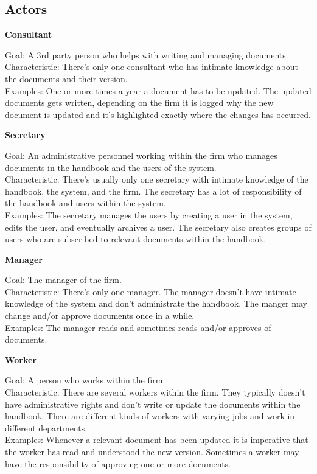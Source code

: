 \subsection{Actors}

\textbf{Consultant}

Goal: A 3rd party person who helps with writing and managing documents.
\\
Characteristic: There’s only one consultant who has intimate knowledge about the documents and their version.
\\
Examples: One or more times a year a document has to be updated. The updated documents gets written, depending on the firm it is logged why the new document is updated and it’s highlighted exactly where the changes has occurred.

\textbf{Secretary}

Goal: An administrative personnel working within the firm who manages documents in the handbook and the users of the system.
\\
Characteristic: There’s usually only one secretary with intimate knowledge of the handbook, the system, and the firm. The secretary has a lot of responsibility of the handbook and users within the system.
\\
Examples: The secretary manages the users by creating a user in the system, edits the user, and eventually archives a user. The secretary also creates groups of users who are subscribed to relevant documents within the handbook.

\textbf{Manager}

Goal: The manager of the firm.
\\
Characteristic: There’s only one manager. The manager doesn’t have intimate knowledge of the system and don’t administrate the handbook. The manger may change and/or approve documents once in a while.
\\
Examples: The manager reads and sometimes reads and/or approves of documents.

\textbf{Worker}

Goal: A person who works within the firm.
\\
Characteristic: There are several workers within the firm. They typically doesn’t have administrative rights and don’t write or update the documents within the handbook. There are different kinds of workers with varying jobs and work in different departments.
\\
Examples: Whenever a relevant document has been updated it is imperative that the worker has read and understood the new version. Sometimes a worker may have the responsibility of approving one or more documents.

